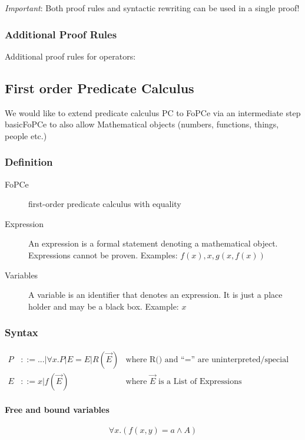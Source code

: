 \emph{Important}: Both proof rules and syntactic rewriting can be used in a single proof!

\subsubsection{Additional Proof Rules}

Additional proof rules for operators: %


\subsection{First order Predicate Calculus}

We would like to extend predicate calculus PC to FoPCe via an intermediate step basicFoPCe to also allow Mathematical objects (numbers, functions, things, people etc.)

\subsubsection{Definition}

\begin{description}
	\item[FoPCe] first-order predicate calculus with equality
	\item[Expression] An expression is a formal statement denoting a mathematical object. Expressions cannot be proven. Examples: $f(x), x, g(x, f(x))$
	\item[Variables] A variable is an identifier that denotes an expression. It is just a place holder and may be a black box. Example: $x$
\end{description}

\subsubsection{Syntax}
\begin{align*}
	P &::= ...| \forall x.P | E = E | R(\vec{E}) 
	& \text{where R() and “=” are uninterpreted/special relationship symbols}\\
	E &::= x | f(\vec{E})
	& \text{where $\vec{E}$ is a List of Expressions}
\end{align*}	

\paragraph{Free and bound variables} \[
	\forall x .(f(x,y) = a \land A)
\]

